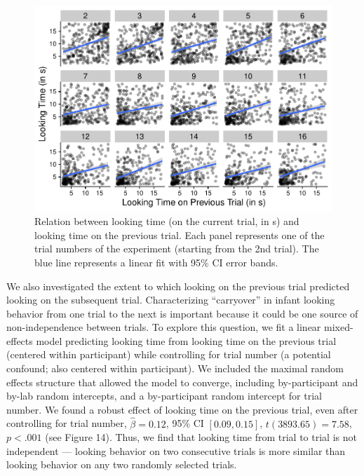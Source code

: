 \documentclass[
  man, donotrepeattitle,floatsintext]{apa6}
\begin{document}
\begin{figure}

{\centering \includegraphics{MB1T_supplement_files/figure-latex/fig14-1} 

}

\caption{Relation between looking time (on the current trial, in s) and looking time on the previous trial. Each panel represents one of the trial numbers of the experiment (starting from the 2nd trial). The blue line represents a linear fit with 95\% CI error bands.}\label{fig:fig14}
\end{figure}

We also investigated the extent to which looking on the previous trial predicted looking on the subsequent trial.
Characterizing ``carryover'' in infant looking behavior from one trial to the next is important because it could be one source of non-independence between trials.
To explore this question, we fit a linear mixed-effects model predicting looking time from looking time on the previous trial (centered within participant) while controlling for trial number (a potential confound; also centered within participant).
We included the maximal random effects structure that allowed the model to converge, including by-participant and by-lab random intercepts, and a by-participant random intercept for trial number.
We found a robust effect of looking time on the previous trial, even after controlling for trial number,
\(\hat{\beta} = 0.12\), 95\% CI \([0.09, 0.15]\), \(t(3893.65) = 7.58\), \(p < .001\) (see Figure 14).
Thus, we find that looking time from trial to trial is not independent --- looking behavior on two consecutive trials is more similar than looking behavior on any two randomly selected trials.
\end{document}
